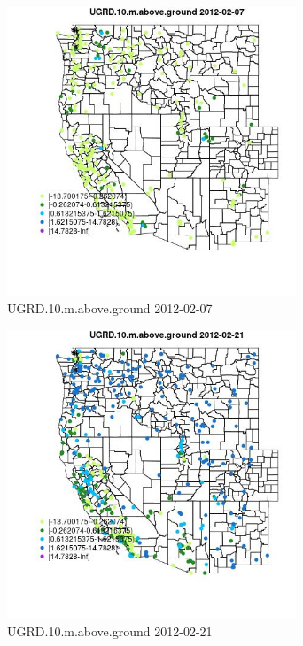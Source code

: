 \begin{figure} 
\centering  
\includegraphics[width=0.77\textwidth]{Code_Outputs/Report_ML_input_PM25_Step4_part_f_de_duplicated_aves_prioritize_24hr_obswNAs_MapObsUGRD10maboveground2012-02-07.jpg} 
\caption{\label{fig:Report_ML_input_PM25_Step4_part_f_de_duplicated_aves_prioritize_24hr_obswNAsMapObsUGRD10maboveground2012-02-07}UGRD.10.m.above.ground 2012-02-07} 
\end{figure} 
 

\begin{figure} 
\centering  
\includegraphics[width=0.77\textwidth]{Code_Outputs/Report_ML_input_PM25_Step4_part_f_de_duplicated_aves_prioritize_24hr_obswNAs_MapObsUGRD10maboveground2012-02-21.jpg} 
\caption{\label{fig:Report_ML_input_PM25_Step4_part_f_de_duplicated_aves_prioritize_24hr_obswNAsMapObsUGRD10maboveground2012-02-21}UGRD.10.m.above.ground 2012-02-21} 
\end{figure} 
 

